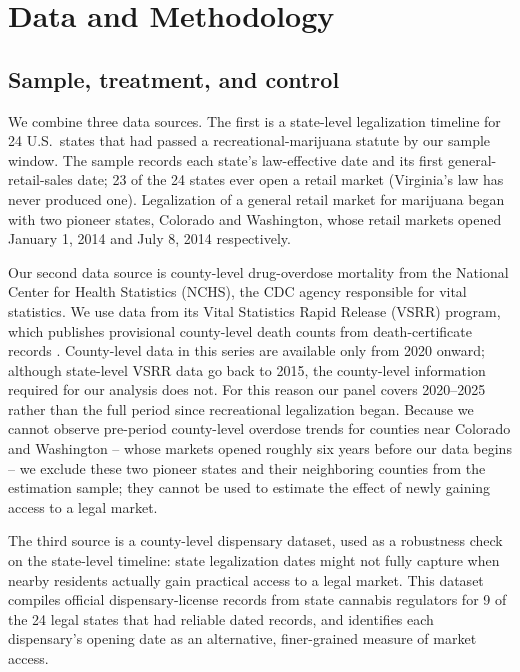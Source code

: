 \documentclass{article}
\begin{document}
\section{Data and Methodology}

\subsection{Sample, treatment, and control}

We combine three data sources. The first is a state-level legalization timeline for 24 U.S.\ states that had passed
a recreational-marijuana statute by our sample window. The sample records each state's law-effective date and its
first general-retail-sales date; 23 of the 24 states ever open a retail market (Virginia's law has never produced
one). Legalization of a general retail market for marijuana began with two pioneer states, Colorado and Washington,
whose retail markets opened January 1, 2014 and July 8, 2014 respectively.

Our second data source is county-level drug-overdose mortality from the National Center for Health Statistics
(NCHS), the CDC agency responsible for vital statistics. We use data from its Vital Statistics Rapid Release (VSRR)
program, which publishes provisional county-level death counts from death-certificate records \citep{AhmadVSRR}.
County-level data in this series are available only from 2020 onward; although state-level VSRR data go back to
2015, the county-level information required for our analysis does not. For this reason our panel covers
2020--2025 rather than the full period since recreational legalization began. Because we cannot observe pre-period
county-level overdose trends for counties near Colorado and Washington -- whose markets opened roughly six years
before our data begins -- we exclude these two pioneer states and their neighboring counties from the estimation
sample; they cannot be used to estimate the effect of newly gaining access to a legal market.

The third source is a county-level dispensary dataset, used as a robustness check on the state-level timeline:
state legalization dates might not fully capture when nearby residents actually gain practical access to a legal
market. This dataset compiles official dispensary-license records from state cannabis regulators for 9 of the 24
legal states that had reliable dated records, and identifies each dispensary's opening date as an alternative,
finer-grained measure of market access.
\end{document}
